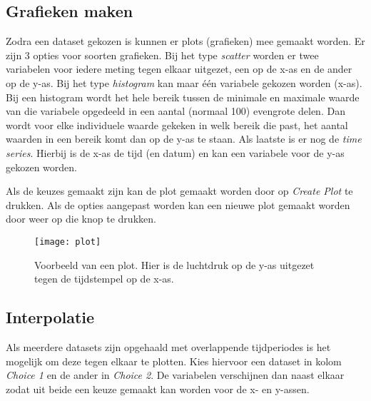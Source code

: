 \subsection{Grafieken maken}\label{subsec:plotting}

Zodra een dataset gekozen is kunnen er plots (grafieken) mee gemaakt
worden. Er zijn 3 opties voor soorten grafieken. Bij het type
\emph{scatter} worden er twee variabelen voor iedere meting tegen elkaar
uitgezet, een op de x-as en de ander op de y-as. Bij het type
\emph{histogram} kan maar één variabele gekozen worden (x-as). Bij een
histogram wordt het hele bereik tussen de minimale en maximale waarde
van die variabele opgedeeld in een aantal (normaal 100) evengrote delen.
Dan wordt voor elke individuele waarde gekeken in welk bereik die past,
het aantal waarden in een bereik komt dan op de y-as te staan. Als
laatste is er nog de \emph{time series}. Hierbij is de x-as de tijd (en
datum) en kan een variabele voor de y-as gekozen worden.

Als de keuzes gemaakt zijn kan de plot gemaakt worden door op
\emph{Create Plot} te drukken. Als de opties aangepast worden kan een
nieuwe plot gemaakt worden door weer op die knop te drukken.

\begin{figure}
    \centering
    \texttt{[image: plot]}
    \caption{Voorbeeld van een plot. Hier is de luchtdruk op de y-as
             uitgezet tegen de tijdstempel op de x-as.}
    \label{fig:get_data}
\end{figure}


\subsection{Interpolatie}

Als meerdere datasets zijn opgehaald met overlappende tijdperiodes is
het mogelijk om deze tegen elkaar te plotten. Kies hiervoor een dataset
in kolom \emph{Choice 1} en de ander in \emph{Choice 2}. De variabelen
verschijnen dan naast elkaar zodat uit beide een keuze gemaakt kan
worden voor de x- en y-assen.


\begin{thebibliography}{9}
\end{thebibliography}


